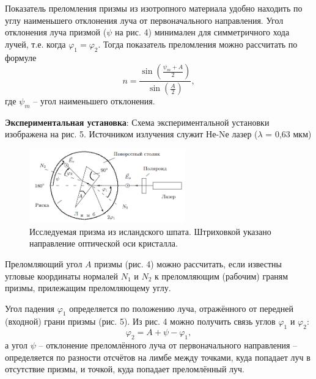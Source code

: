 \documentclass[a4paper,12pt]{article}
\begin{document}
Показатель преломления призмы из изотропного материала удобно находить по углу наименьшего отклонения луча от первоначального направления. Угол отклонения луча призмой ($\psi$ на рис. 4) минимален для симметричного хода лучей, т.е. когда $\varphi_1 = \varphi_2$. Тогда показатель преломления можно рассчитать по формуле
\begin{equation}\label{eq: n via min psi}
    n = \frac{\sin(\frac{\psi_m + A}{2})}{\sin(\frac{A}{2})},
\end{equation}
где $\psi_m$ -- угол наименьшего отклонения.

\textbf{Экспериментальная установка}:
Схема экспериментальной установки изображена на рис. 5. Источником излучения служит Не-Nе лазер ($\lambda$ = 0,63 мкм)
\begin{figure}[H]\label{fig: Exp setup}
    \centering
    \includegraphics[width = 0.6\textwidth]{Exp setup.png}
    \caption{Исследуемая призма из исландского шпата. Штриховкой указано направление оптической оси кристалла.}
\end{figure}
Преломляющий угол $A$ призмы (рис. 4) можно рассчитать, если известны угловые
координаты нормалей $N_1$ и $N_2$ к преломляющим (рабочим) граням призмы, прилежащим преломляющему углу.

Угол падения $\varphi_1$ определяется по положению луча, отражённого от передней (входной) грани призмы (рис. 5). Из рис. 4 можно получить связь углов $\varphi_1$ и $\varphi_2$:
\begin{equation}\label{eq: phi_2 via psi A phi_1}
    \varphi_2 = A + \psi - \varphi_1,
\end{equation}
а угол $\psi$ -- отклонение преломлённого луча от первоначального направления -- определяется по разности отсчётов на лимбе между точками, куда попадает луч в отсутствие призмы, и точкой, куда попадает преломлённый луч. 
\end{document}

